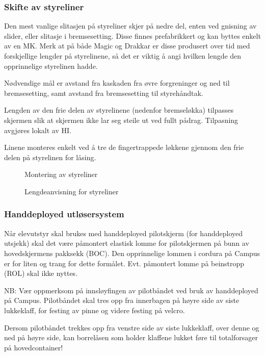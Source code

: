 \subsubsection{Skifte av styreliner}
Den mest vanlige slitasjen på styreliner skjer på nedre del, enten ved gnisning av slider, eller slitasje i bremsesetting. Disse finnes prefabrikkert og kan byttes enkelt av en MK. Merk at på både Magic og Drakkar er disse produsert over tid med forskjellige lengder på styrelinene, så det er viktig å angi hvilken lengde den opprinnelige styrelinen hadde.

Nødvendige mål er avstand fra kaskaden fra øvre forgreninger og ned til bremsesetting, samt avstand fra bremsesetting til styrehåndtak.

Lengden av den frie delen av styrelinene (nedenfor bremseløkka) tilpasses skjermen slik at skjermen ikke lar seg steile ut ved fullt pådrag. Tilpasning avgjøres lokalt av HI.

Linene monteres enkelt ved å tre de fingertrappede løkkene gjennom den frie delen på styrelinen for låsing.

\begin{figure}
	\caption{Montering av styreliner}
\end{figure}

\begin{figure}
	\caption{Lengdeanvisning for styreliner}
\end{figure}

\subsubsection{Handdeployed utløsersystem}
Når elevutstyr skal brukes med handdeployed pilotskjerm (for handdeployed utsjekk) skal det være påmontert elastisk lomme for pilotskjermen på bunn av hovedskjermens pakksekk (BOC). Den opprinnelige lommen i cordura på Campus er for liten og trang for dette formålet. Evt. påmontert lomme på beinstropp (ROL) skal ikke nyttes.

NB: Vær oppmerksom på innsløyfingen av pilotbåndet ved bruk av handdeployed på Campus. Pilotbåndet skal tres opp fra innerbagen på høyre side av siste lukkeklaff, for festing av pinne og videre festing på velcro.

Dersom pilotbåndet trekkes opp fra venstre side av siste lukkeklaff, over denne og ned på høyre side, kan borrelåsen som holder klaffene lukket føre til totalforsager på hovedcontainer!

